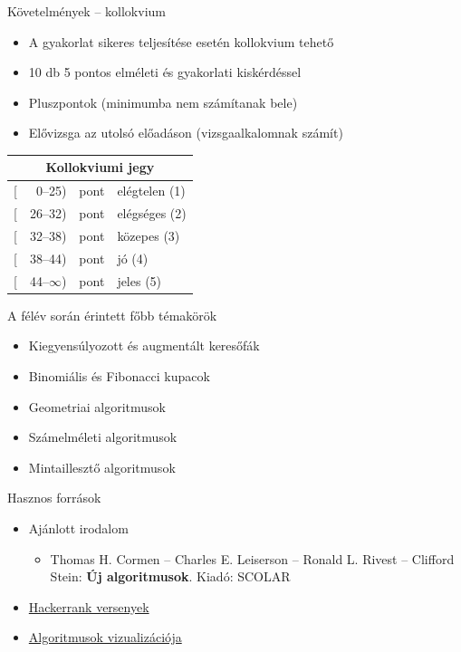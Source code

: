 \documentclass{beamer}
\begin{document}
\begin{frame}{Követelmények -- kollokvium}
	\begin{itemize}
		\item A gyakorlat sikeres teljesítése esetén kollokvium tehető
		\item 10 db 5 pontos elméleti és gyakorlati kiskérdéssel
		\item Pluszpontok (minimumba nem számítanak bele)
		\item Elővizsga az utolsó előadáson (vizsgaalkalomnak számít)
	\end{itemize}
	\pause	
		\begin{table}
		\centering
		\begin{tabular}{r@{}r@{ }l|l}
			\multicolumn{4}{c}{Kollokviumi jegy} \\ \hline
			{[}&0--25)  & pont & elégtelen (1) \\
			{[}&26--32) & pont & elégséges (2) \\
			{[}&32--38) & pont & közepes (3) \\
			{[}&38--44) & pont & jó (4) \\
			{[}&44--$\infty$) & pont & jeles (5)
		\end{tabular}
	    \end{table}
\end{frame}

\begin{frame}{A félév során érintett főbb témakörök}
	\begin{itemize}
		\item Kiegyensúlyozott és augmentált keresőfák
		\item Binomiális és Fibonacci kupacok
		\item Geometriai algoritmusok
		\item Számelméleti algoritmusok
		\item Mintaillesztő algoritmusok
	\end{itemize}
\end{frame}

\begin{frame}{Hasznos források}
	\begin{itemize}
		\item Ajánlott irodalom
		\begin{itemize}
			\item Thomas H. Cormen -- Charles E. Leiserson -- Ronald L. Rivest -- Clifford Stein: \textbf{Új algoritmusok}.  Kiadó: SCOLAR
		\end{itemize}
	\end{itemize}
	\begin{itemize}
		\item \href{https://www.hackerrank.com/contests}{Hackerrank versenyek}
		\item \href{https://www.cs.usfca.edu/~galles/visualization/}{Algoritmusok vizualizációja}
	\end{itemize}
\end{frame}
\end{document}

